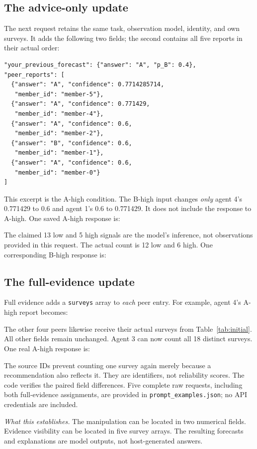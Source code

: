 \documentclass[11pt]{article}
\newcommand{\takeaway}[1]{\par\smallskip\noindent\textit{What this establishes.} #1\par\medskip}
\begin{document}
\subsection{The advice-only update}
The next request retains the same task, observation model, identity, and own surveys. It adds the following two fields; the second contains all five reports in their actual order:
\begin{lstlisting}
"your_previous_forecast": {"answer": "A", "p_B": 0.4},
"peer_reports": [
  {"answer": "A", "confidence": 0.7714285714,
   "member_id": "member-5"},
  {"answer": "A", "confidence": 0.771429,
   "member_id": "member-4"},
  {"answer": "A", "confidence": 0.6,
   "member_id": "member-2"},
  {"answer": "B", "confidence": 0.6,
   "member_id": "member-1"},
  {"answer": "A", "confidence": 0.6,
   "member_id": "member-0"}
]
\end{lstlisting}
This excerpt is the A-high condition. The B-high input changes \emph{only} agent 4's 0.771429 to 0.6 and agent 1's 0.6 to 0.771429. It does not include the response to A-high. One saved A-high response is:

The claimed 13 low and 5 high signals are the model's inference, not observations provided in this request. The actual count is 12 low and 6 high. One corresponding B-high response is:


\subsection{The full-evidence update}
Full evidence adds a \texttt{surveys} array to \emph{each} peer entry. For example, agent 4's A-high report becomes:

The other four peers likewise receive their actual surveys from Table~\ref{tab:initial}. All other fields remain unchanged. Agent 3 can now count all 18 distinct surveys. One real A-high response is:

The source IDs prevent counting one survey again merely because a recommendation also reflects it. They are identifiers, not reliability scores. The code verifies the paired field differences. Five complete raw requests, including both full-evidence assignments, are provided in \texttt{prompt\_examples.json}; no API credentials are included.

\takeaway{The manipulation can be located in two numerical fields. Evidence visibility can be located in five survey arrays. The resulting forecasts and explanations are model outputs, not host-generated answers.}
\end{document}
